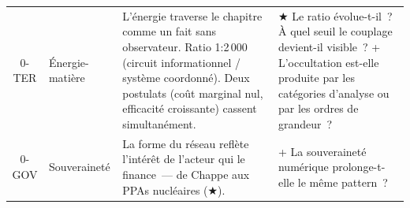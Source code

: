 \begin{table}[p]
\begin{tabularx}{\textwidth}{@{}cp{1.8cm}Xp{5.2cm}@{}}
\midrule
0-TER & Énergie-matière & L'énergie traverse le chapitre comme un fait sans observateur. Ratio 1:2\,000 (circuit informationnel / système coordonné). Deux postulats (coût marginal nul, efficacité croissante) cassent simultanément. & ★ Le ratio évolue-t-il~? À quel seuil le couplage devient-il visible~? \newline + L'occultation est-elle produite par les catégories d'analyse ou par les ordres de grandeur~? \\[4pt]
0-GOV & Souveraineté & La forme du réseau reflète l'intérêt de l'acteur qui le finance~--- de Chappe aux PPAs nucléaires (★). & + La souveraineté numérique prolonge-t-elle le même pattern~? \\
\bottomrule
\end{tabularx}
\renewcommand{\arraystretch}{1.0}
\end{table}

